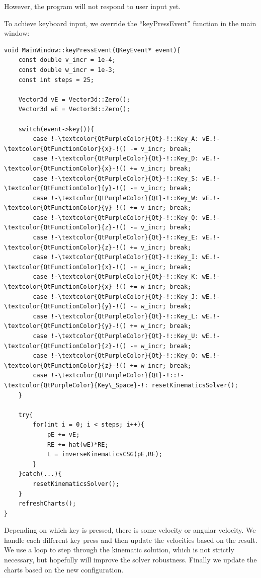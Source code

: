 \documentclass[12pt]{article}
\begin{document}
\noindent
However, the program will not respond to user input yet.

\noindent To achieve keyboard input, we override the ``keyPressEvent'' function in the main window:
\begin{lstlisting}
void MainWindow::keyPressEvent(QKeyEvent* event){
    const double v_incr = 1e-4;
    const double w_incr = 1e-3;
    const int steps = 25;

    Vector3d vE = Vector3d::Zero();
    Vector3d wE = Vector3d::Zero();

    switch(event->key()){
        case !-\textcolor{QtPurpleColor}{Qt}-!::Key_A: vE.!-\textcolor{QtFunctionColor}{x}-!() -= v_incr; break;
        case !-\textcolor{QtPurpleColor}{Qt}-!::Key_D: vE.!-\textcolor{QtFunctionColor}{x}-!() += v_incr; break;
        case !-\textcolor{QtPurpleColor}{Qt}-!::Key_S: vE.!-\textcolor{QtFunctionColor}{y}-!() -= v_incr; break;
        case !-\textcolor{QtPurpleColor}{Qt}-!::Key_W: vE.!-\textcolor{QtFunctionColor}{y}-!() += v_incr; break;
        case !-\textcolor{QtPurpleColor}{Qt}-!::Key_Q: vE.!-\textcolor{QtFunctionColor}{z}-!() -= v_incr; break;
        case !-\textcolor{QtPurpleColor}{Qt}-!::Key_E: vE.!-\textcolor{QtFunctionColor}{z}-!() += v_incr; break;
        case !-\textcolor{QtPurpleColor}{Qt}-!::Key_I: wE.!-\textcolor{QtFunctionColor}{x}-!() -= w_incr; break;
        case !-\textcolor{QtPurpleColor}{Qt}-!::Key_K: wE.!-\textcolor{QtFunctionColor}{x}-!() += w_incr; break;
        case !-\textcolor{QtPurpleColor}{Qt}-!::Key_J: wE.!-\textcolor{QtFunctionColor}{y}-!() -= w_incr; break;
        case !-\textcolor{QtPurpleColor}{Qt}-!::Key_L: wE.!-\textcolor{QtFunctionColor}{y}-!() += w_incr; break;
        case !-\textcolor{QtPurpleColor}{Qt}-!::Key_U: wE.!-\textcolor{QtFunctionColor}{z}-!() -= w_incr; break;
        case !-\textcolor{QtPurpleColor}{Qt}-!::Key_O: wE.!-\textcolor{QtFunctionColor}{z}-!() += w_incr; break;
        case !-\textcolor{QtPurpleColor}{Qt}-!::!-\textcolor{QtPurpleColor}{Key\_Space}-!: resetKinematicsSolver();
    }

    try{
        for(int i = 0; i < steps; i++){
            pE += vE;
            RE += hat(wE)*RE;
            L = inverseKinematicsCSG(pE,RE);
        }
    }catch(...){
        resetKinematicsSolver();
    }
    refreshCharts();
}
\end{lstlisting}
Depending on which key is pressed, there is some velocity or angular velocity. We handle each different key press and then update the velocities based on the result. We use a loop to step through the kinematic solution, which is not strictly necessary, but hopefully will improve the solver robustness. Finally we update the charts based on the new configuration.
\end{document}
